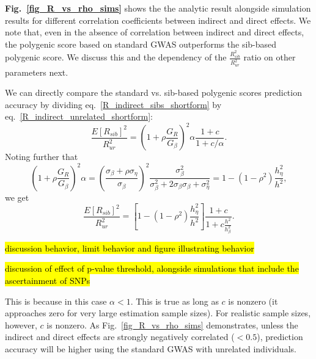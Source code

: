 \documentclass[hidelinks, 12pt]{article}
\begin{document}
{\bf Fig.~\ref{fig_R_vs_rho_sims}} shows the the analytic result alongside simulation results for different correlation coefficients between indirect and direct effects.  We note that, even in the absence of correlation between indirect and direct effects, the polygenic score based on standard GWAS outperforms the sib-based polygenic score.  We discuss this and the dependency of the $\frac{R_{sib}^2}{R_{ur}^2}$ ratio on other parameters next.

We can directly compare the standard vs. sib-based polygenic scores prediction accuracy by dividing eq.~\ref{R_indirect_sibs_shortform} by eq.~\ref{R_indirect_unrelated_shortform}:
$$\frac{E[R_{sib}]^2}{R_{ur}^2}=\left(1+\rho \frac{G_{R}}{G_{\beta}}\right)^{2}\alpha \frac{1+c}{1+c/\alpha}.$$
Noting further that
$$\left(1+\rho \frac{G_{R}}{G_{\beta}}\right)^{2} \alpha=\left(\frac{\sigma_\beta+\rho \sigma_\eta}{\sigma_\beta}\right)^{2} \frac{\sigma_\beta^{2}}{\sigma_\beta^{2}+2 \sigma_{\beta} \sigma_{\beta}+\sigma_{\eta}^{2}}=1-(1-\rho^2)\frac{h_\eta^2}{h^2},$$
we get
\begin{equation}
\label{R2_ratio}
\frac{E[R_{sib}]^2}{R_{ur}^2}=[ 1-(1-\rho^2) \frac{h_\eta^2}{h^2}]\frac{1+c}{1+c\frac{h^2}{h_\beta^2}}.
\end{equation}

\hl{discussion behavior, limit behavior and figure illustrating behavior}

\hl{discussion of effect of p-value threshold, alongside simulations that include the ascertainment of SNPs}

\vspace{0.5cm}

This is because in this case $\alpha < 1$.  This is true as long as $c$ is nonzero (it approaches zero for very large estimation sample sizes). For realistic sample sizes, however, $c$ is nonzero.  As Fig.~\ref{fig_R_vs_rho_sims} demonstrates, unless the indirect and direct effects are strongly negatively correlated ($<0.5$), prediction accuracy will be higher using the standard GWAS with unrelated individuals.\\
\end{document}
